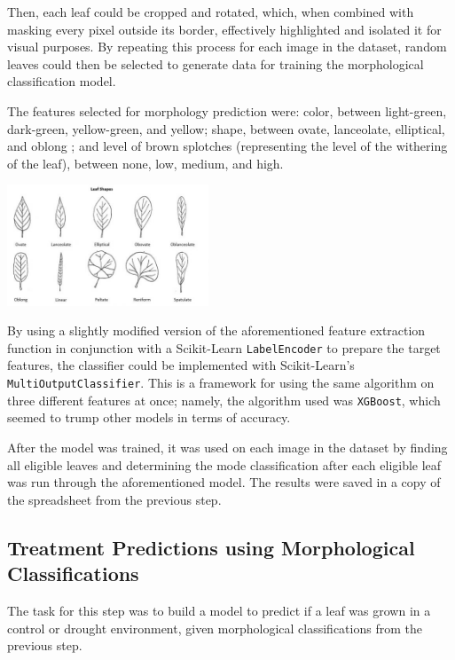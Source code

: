 \documentclass[final,5p,times,twocolumn,authoryear]{elsarticle}
\begin{document}
Then, each leaf could be cropped and rotated, which, when combined with masking every pixel outside its border, effectively highlighted and isolated it for visual purposes. By repeating this process for each image in the dataset, random leaves could then be selected to generate data for training the morphological classification model.

The features selected for morphology prediction were: color, between light-green, dark-green, yellow-green, and yellow; shape, between ovate, lanceolate, elliptical, and oblong \citep{nakano2020plant}; and level of brown splotches (representing the level of the withering of the leaf), between none, low, medium, and high.

\begin{center}
    \includegraphics[width=0.45\textwidth]{images/leaf_shapes.jpeg}
\end{center}

By using a slightly modified version of the aforementioned feature extraction function in conjunction with 
a Scikit-Learn \verb|LabelEncoder| to prepare the target features, the classifier could be implemented with Scikit-Learn's \verb|MultiOutputClassifier|. This is a framework for using the same algorithm on three different features at once; namely, the algorithm used was \verb|XGBoost|, which seemed to trump other models in terms of accuracy.

After the model was trained, it was used on each image in the dataset by finding all eligible leaves and determining the mode classification after each eligible leaf was run through the aforementioned model. The results were saved in a copy of the spreadsheet from the previous step. 

\subsection{Treatment Predictions using Morphological Classifications}
\label{step_3}

The task for this step was to build a model to predict if a leaf was grown in a control or drought environment, given morphological classifications from the previous step.
\end{document}
